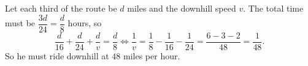 Let each third of the route be $d$ miles and the downhill speed $v$. The total time must be $\dfrac{3d}{24}=\dfrac d8$ hours, so
\[\dfrac{d}{16}+\dfrac{d}{24}+\dfrac dv=\dfrac d8\iff\dfrac1v=\dfrac18-\dfrac1{16}-\dfrac1{24}=\dfrac{6-3-2}{48}=\dfrac1{48}.\]
So he must ride downhill at $\boxed{48}$ miles per hour.
